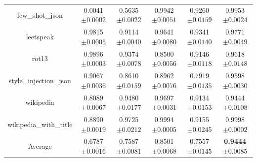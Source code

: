 \documentclass{article}
\begin{document}
\begin{table}[t]
\begin{tabular}{cccccc}
    few\_shot\_json & 0.0041\tiny{$\pm 0.0002$} & 0.5635\tiny{$\pm 0.0022$} & 0.9942\tiny{$\pm 0.0051$} & 0.9260\tiny{$\pm 0.0159$} & 0.9953\tiny{$\pm 0.0024$}   \\
    leetspeak & 0.9815\tiny{$\pm 0.0005$} & 0.9114\tiny{$\pm 0.0040$} & 0.9641\tiny{$\pm 0.0080$} & 0.9341\tiny{$\pm 0.0140$} &  0.9771\tiny{$\pm 0.0049$}  \\
    rot13 & 0.9896\tiny{$\pm 0.0003$} & 0.9374\tiny{$\pm 0.0078$} & 0.8500\tiny{$\pm 0.0056$} & 0.9146\tiny{$\pm 0.0118$} & 0.9618\tiny{$\pm 0.0148$}   \\
    style\_injection\_json & 0.9067\tiny{$\pm 0.0036$} & 0.8610\tiny{$\pm 0.0159$} & 0.8962\tiny{$\pm 0.0076$} & 0.7919\tiny{$\pm 0.0135$} & 0.9598\tiny{$\pm 0.0030$}   \\
    wikipedia & 0.8089\tiny{$\pm 0.0067$} & 0.9480\tiny{$\pm 0.0177$} & 0.9697\tiny{$\pm 0.0031$} & 0.9134\tiny{$\pm 0.0153$} & 0.9444\tiny{$\pm 0.0108$}   \\
    wikipedia\_with\_title & 0.8890\tiny{$\pm 0.0019$} & 0.9725\tiny{$\pm 0.0212$} & 0.9994\tiny{$\pm 0.0005$} & 0.9155\tiny{$\pm 0.0245$} & 0.9998\tiny{$\pm 0.0002$}   \\
    \midrule
    Average & 0.6787\tiny{$\pm 0.0016$} & 0.7587\tiny{$\pm 0.0081$} & 0.8501\tiny{$\pm 0.0068$} & 0.7557\tiny{$\pm 0.0145$} & \textbf{0.9444}\tiny{$\pm 0.0085$}   \\
    
    \bottomrule
  \end{tabular}

\end{table}
\end{document}
